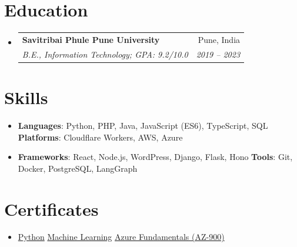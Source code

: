 \documentclass[letterpaper,11pt]{article}
\makeatletter
\newcommand{\resumeSubheading}[4]{
  \vspace{-1pt}\item
    \begin{tabular*}{0.97\textwidth}{l@{\extracolsep{\fill}}r}
      \textbf{#1} & #2 \\
      \textit{\small#3} & \textit{\small #4} \\
    \end{tabular*}\vspace{-5pt}
}
\newcommand{\resumeSubHeadingListStart}{\begin{itemize}[leftmargin=*]}
\newcommand{\resumeSubHeadingListEnd}{\end{itemize}}
\makeatother
\begin{document}
\section{Education}
  \resumeSubHeadingListStart
    \resumeSubheading
      {Savitribai Phule Pune University}{Pune, India}
      {B.E., Information Technology;  GPA: 9.2/10.0}{2019 -- 2023}
  \resumeSubHeadingListEnd


\section{Skills}
 \resumeSubHeadingListStart
   \item\small{\textbf{Languages}{: Python, PHP, Java, JavaScript (ES6), TypeScript, SQL} \hfill \textbf{Platforms}{: Cloudflare Workers, AWS, Azure}}\vspace{-4pt}
   \item\small{\textbf{Frameworks}{: React, Node.js, WordPress, Django, Flask, Hono} \hfill \textbf{Tools}{: Git, Docker, PostgreSQL, LangGraph}}
 \resumeSubHeadingListEnd


\section{Certificates}
 \resumeSubHeadingListStart
   \item\small{
     \href{https://www.kaggle.com/learn/certification/swanandmathekar/python}{Python} \textbar{}
     \href{https://www.kaggle.com/learn/certification/swanandmathekar/intro-to-machine-learning}{Machine Learning} \textbar{}
     \href{https://learn.microsoft.com/api/credentials/share/en-us/SwanandM-7652/344706EC24B39F76?sharingId=D4DB318B4BD86C22}{Azure Fundamentals (AZ-900)}
   }
 \resumeSubHeadingListEnd


\end{document}
